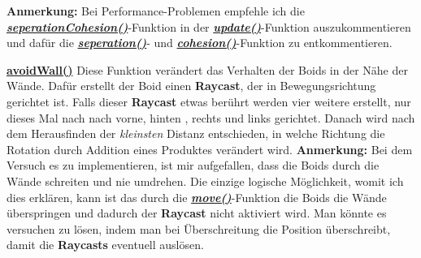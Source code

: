 \documentclass[a4paper, hidelinks, 12pt]{article}
\begin{document}
\textbf{Anmerkung:}
Bei Performance-Problemen empfehle ich die \hyperref[sec:seperationCohesion]{\textbf{\emph{seperationCohesion()}}}-Funktion in der \hyperref[sec:update]{\textbf{\emph{update()}}}-Funktion auszukommentieren und dafür die \hyperref[sec:seperation]{\textbf{\emph{seperation()}}}- und \hyperref[sec:cohesion]{\textbf{\emph{cohesion()}}}-Funktion zu entkommentieren.
\newline\newline

		
\underline{\textbf{avoidWall()}}\label{sec:avoidWall}
Diese Funktion verändert das Verhalten der Boids in der Nähe der Wände. Dafür erstellt der Boid einen \textbf{Raycast}\cite{raycast}, der in Bewegungsrichtung gerichtet ist. Falls dieser \textbf{Raycast} etwas berührt werden vier weitere erstellt, nur dieses Mal nach nach vorne, hinten , rechts und links gerichtet. Danach wird nach dem Herausfinden der \emph{kleinsten} Distanz\cite{HitInfo} entschieden, in welche Richtung die Rotation durch Addition eines Produktes verändert wird.
\scriptsize\textbf{Anmerkung:} Bei dem Versuch es zu implementieren, ist mir aufgefallen, dass die Boids durch die Wände schreiten und nie umdrehen. Die einzige logische Möglichkeit, womit ich dies erklären, kann ist das durch die \hyperref[sec:move]{\textbf{\emph{move()}}}-Funktion die Boids die Wände überspringen und dadurch der \textbf{Raycast} nicht aktiviert wird. Man könnte es versuchen zu lösen, indem man bei Überschreitung die Position überschreibt, damit die \textbf{Raycasts} eventuell auslösen.
\newline\newline
	
\end{document}

